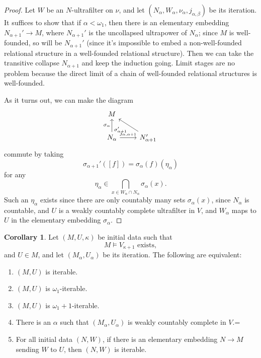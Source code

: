\documentclass[12pt]{report}
\theoremstyle{definition}
\newtheorem{corollary}[theorem]{Corollary}
\begin{document}
\begin{proof}
Let $W$ be an $N$-ultrafilter on $\nu$, and let $(N_\alpha, W_\alpha, \nu_\alpha, j_{\alpha,\beta})$ be its iteration.
It suffices to show that if $\alpha < \omega_1$, then there is an elementary embedding $N_{\alpha + 1}' \to M$, where $N_{\alpha + 1}'$ is the uncollapsed ultrapower of $N_\alpha$; since $M$ is well-founded, so will be $N_{\alpha + 1}'$ (since it's impossible to embed a non-well-founded relational structure in a well-founded relational structure).
Then we can take the transitive collapse $N_{\alpha + 1}$ and keep the induction going.
Limit stages are no problem because the direct limit of a chain of well-founded relational structures is well-founded.

As it turns out, we can make the diagram
$$\begin{tikzcd}
M \\
N_\alpha \arrow[u,"\sigma_\alpha"] \arrow[r,"j_{\alpha,\alpha+1}"] & N_{\alpha + 1}' \arrow[ul,"\sigma_{\alpha+1}'"]
\end{tikzcd}$$
commute by taking
$$\sigma_{\alpha + 1}'([f]) = \sigma_\alpha(f)(\eta_\alpha)$$
for any
$$\eta_\alpha \in \bigcap_{x \in W_\alpha \cap N_\alpha} \sigma_\alpha(x).$$
Such an $\eta_\alpha$ exists since there are only countably many sets $\sigma_\alpha(x)$, since $N_\alpha$ is countable, and $U$ is a weakly countably complete ultrafilter in $V$, and $W_\alpha$ maps to $U$ in the elementary embedding $\sigma_\alpha$.
\end{proof}
\begin{corollary}
Let $(M, U, \kappa)$ be initial data such that
$$M \models \text{$V_{\kappa + 1}$ exists},$$
and $U \in M$, and let $(M_\alpha, U_\alpha)$ be its iteration. The following are equivalent:
\begin{enumerate}
\item $(M, U)$ is iterable.
\item $(M, U)$ is $\omega_1$-iterable.
\item $(M, U)$ is $\omega_1 + 1$-iterable.
\item There is an $\alpha$ such that $(M_\alpha, U_\alpha)$ is weakly countably complete in $V$.=
\item For all initial data $(N, W)$, if there is an elementary embedding $N \to M$ sending $W$ to $U$, then $(N, W)$ is iterable.
\end{enumerate}
\end{corollary}
\end{document}
